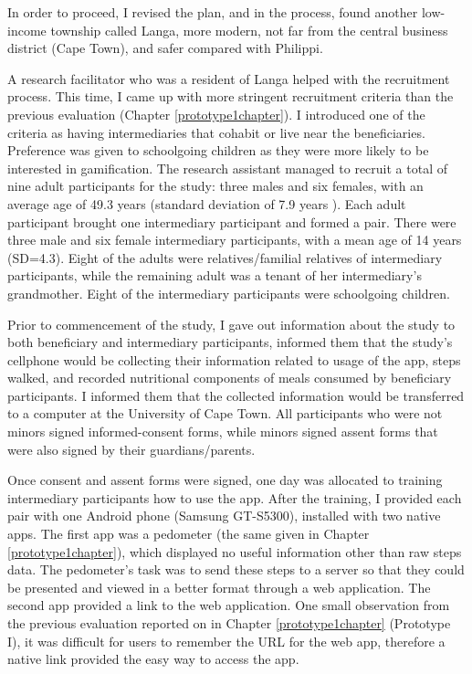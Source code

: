 In order to proceed, I revised the plan, and in the process, found another low-income township called Langa, more modern, not far from the central business district (Cape Town), and safer compared with Philippi. 

A research facilitator who was a resident of Langa helped with the recruitment process. This time, I came up with more stringent recruitment criteria than the previous evaluation (Chapter \ref{prototype1chapter}). I introduced one of the criteria as having intermediaries that cohabit or live near the beneficiaries. Preference was given to schoolgoing children as they were more likely to be interested in gamification. The research assistant managed to recruit a total of nine adult participants for the study: three males and six females, with an average age of 49.3 years (standard deviation of 7.9 years ). Each adult participant brought one intermediary participant and formed a pair. There were three male and six female intermediary participants, with a mean age of 14 years (SD=4.3). Eight of the adults  were relatives/familial relatives of intermediary participants, while the remaining adult was a tenant of her intermediary's grandmother. Eight of the intermediary participants were schoolgoing children.

Prior to commencement of the study, I gave out information about the study to both beneficiary and intermediary participants, informed them that the study's cellphone would be collecting their information related to usage of the app, steps walked, and recorded nutritional components of meals consumed by beneficiary participants. I informed them that the collected information would be transferred to a computer at the University of Cape Town. All participants who were not minors signed informed-consent forms, while minors signed assent forms that were also signed by their guardians/parents.

Once consent and assent forms were signed, one day was allocated to training intermediary participants how to use the app. After the training, I provided each pair with one Android phone (Samsung
GT-S5300), installed with two native apps. The first app was a pedometer (the same given in Chapter \ref{prototype1chapter}), which displayed no useful information other than raw steps data. The pedometer's task was to send these steps to a server so that they could be presented  and viewed in a better format through a web application. The second app provided a link to the web application. One small observation from the previous evaluation reported on in Chapter \ref{prototype1chapter} (Prototype I), it was difficult for users to remember the URL for the web app, therefore a native link provided the easy way to access the app.

